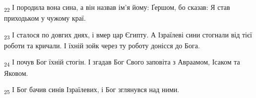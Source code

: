 \begin{tcolorbox}
\textsubscript{22} І породила вона сина, а він назвав ім'я йому: Ґершом, бо сказав: Я став приходьком у чужому краї.
\end{tcolorbox}
\begin{tcolorbox}
\textsubscript{23} І сталося по довгих днях, і вмер цар Єгипту. А Ізраїлеві сини стогнали від тієї роботи та кричали. І їхній зойк через ту роботу донісся до Бога.
\end{tcolorbox}
\begin{tcolorbox}
\textsubscript{24} І почув Бог їхній стогін. І згадав Бог Свого заповіта з Авраамом, Ісаком та Яковом.
\end{tcolorbox}
\begin{tcolorbox}
\textsubscript{25} І Бог бачив синів Ізраїлевих, і Бог зглянувся над ними.
\end{tcolorbox}
